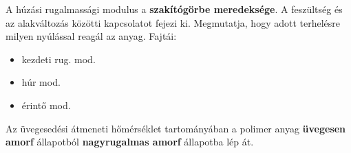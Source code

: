 \documentclass[12pt,a4paper]{article}       %
\begin{document}
\begin{tcbitemize}
  \tcbitem[title={\# \thetcbrasternum{} –
        Hogyan határozhatjuk meg egy polimer húzási rugalmassági modulusát?
      }]
  A húzási rugalmassági modulus a \textbf{szakítógörbe meredeksége}. A
  feszültség és az alakváltozás közötti kapcsolatot fejezi ki. Megmutatja, hogy
  adott terhelésre milyen nyúlással reagál az anyag. Fajtái:
  \begin{itemize}
    \item kezdeti rug. mod.
    \item húr mod.
    \item érintő mod.
  \end{itemize}



  \tcbitem[title={\# \thetcbrasternum{} –
        Mit jelent az üveges átmeneti hőmérséklet-tartomány?
      }]
  Az üvegesedési átmeneti hőmérséklet tartományában a polimer anyag
  \textbf{üvegesen amorf} állapotból \textbf{nagyrugalmas amorf} állapotba lép
  át.




\end{tcbitemize}
\end{document}

